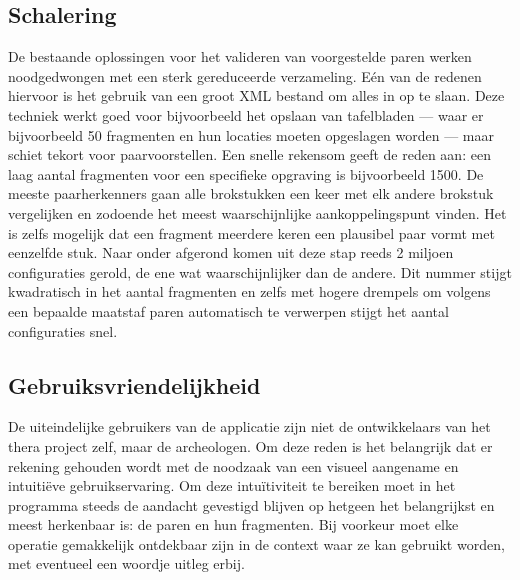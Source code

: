 \subsection{Schalering}
De bestaande oplossingen voor het valideren van voorgestelde paren werken noodgedwongen met een sterk gereduceerde verzameling. E\'en van de redenen hiervoor is het gebruik van een groot XML bestand om alles in op te slaan. Deze techniek werkt goed voor bijvoorbeeld het opslaan van tafelbladen --- waar er bijvoorbeeld 50 fragmenten en hun locaties moeten opgeslagen worden --- maar schiet tekort voor paarvoorstellen. Een snelle rekensom geeft de reden aan: een laag aantal fragmenten voor een specifieke opgraving is bijvoorbeeld 1500. De meeste paarherkenners gaan alle brokstukken een keer met elk andere brokstuk vergelijken en zodoende het meest waarschijnlijke aankoppelingspunt vinden. Het is zelfs mogelijk dat een fragment meerdere keren een plausibel paar vormt met eenzelfde stuk. Naar onder afgerond komen uit deze stap reeds 2 miljoen configuraties gerold, de ene wat waarschijnlijker dan de andere. Dit nummer stijgt kwadratisch in het aantal fragmenten en zelfs met hogere drempels om volgens een bepaalde maatstaf paren automatisch te verwerpen stijgt het aantal configuraties snel.

\subsection{Gebruiksvriendelijkheid}
De uiteindelijke gebruikers van de applicatie zijn niet de ontwikkelaars van het thera project zelf, maar de archeologen. Om deze reden is het belangrijk dat er rekening gehouden wordt met de noodzaak van een visueel aangename en intuiti\"eve gebruikservaring. Om deze intu\"itiviteit te bereiken moet in het programma steeds de aandacht gevestigd blijven op hetgeen het belangrijkst en meest herkenbaar is: de paren en hun fragmenten. Bij voorkeur moet elke operatie gemakkelijk ontdekbaar zijn in de context waar ze kan gebruikt worden, met eventueel een woordje uitleg erbij.\\

